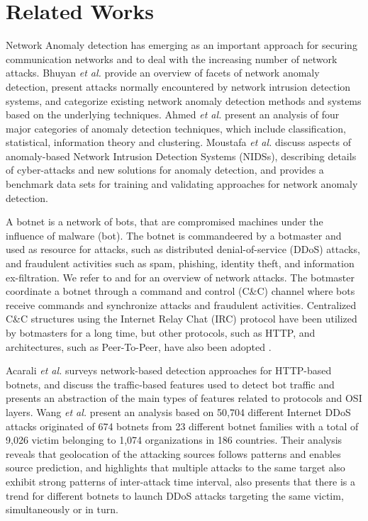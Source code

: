\section{Related Works}
\label{sec:4_relatedworks}

Network Anomaly detection has emerging as an important approach for securing communication networks and to deal with the increasing number of network attacks. Bhuyan \emph{et al.} \cite{bhuyan2014network} provide an overview of facets of network anomaly detection, present attacks normally encountered by network intrusion detection systems, and categorize existing network anomaly detection methods and systems based on the underlying techniques. Ahmed \emph{et al.} \cite{ahmed2016survey} present an analysis of four major categories of anomaly detection techniques, which include classification, statistical, information theory and clustering. Moustafa \emph{et al.} \cite{moustafa2019holistic} discuss aspects of anomaly-based Network Intrusion Detection Systems (NIDSs), describing details of cyber-attacks and new solutions for anomaly detection, and provides a benchmark data sets for training and validating approaches for network anomaly detection.

A botnet is a network of bots, that are compromised machines under the influence of malware (bot). The botnet is commandeered by a botmaster and used as resource for attacks, such as distributed denial-of-service (DDoS) attacks, and fraudulent activities such as spam, phishing, identity theft, and information ex-filtration. We refer to \cite{ahmed2016survey} and \cite{moustafa2019holistic} for an overview of network attacks. The botmaster coordinate a botnet through a command and control (C\&C) channel where bots receive commands and synchronize attacks and fraudulent activities. Centralized C\&C structures using the Internet Relay Chat (IRC) protocol have been utilized by botmasters for a long time, but other protocols, such as HTTP, and architectures, such as Peer-To-Peer, have also been adopted \cite{gu2008botminer}.

Acarali \emph{et al.} \cite{acarali2016survey} surveys network-based detection approaches for HTTP-based botnets, and discuss the traffic-based features used to detect bot traffic and presents an abstraction of the main types of features related to protocols and OSI layers. Wang \emph{et al.} \cite{Wang2018ddosbotnetssurvey} present an analysis based on 50,704 different Internet DDoS attacks originated of 674 botnets from 23 different botnet families with a total of 9,026 victim belonging to 1,074 organizations in 186 countries. Their analysis reveals that geolocation of the attacking sources follows patterns and enables source prediction, and highlights that multiple attacks to the same target also exhibit strong patterns of inter-attack time interval, also presents that there is a trend for different botnets to launch DDoS attacks targeting the same victim, simultaneously or in turn.

